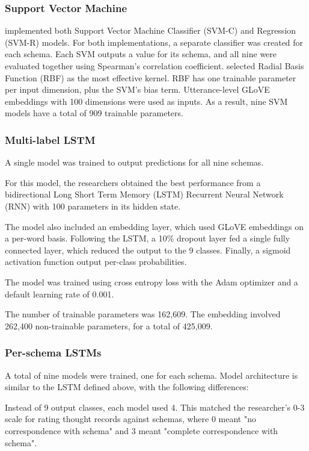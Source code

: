\documentclass[11pt,a4paper]{article}
\begin{document}
\subsubsection{Support Vector Machine}
\citeauthor{burger_2021} implemented both Support Vector Machine Classifier (SVM-C) and Regression (SVM-R) models. For both implementations, a separate classifier was created for each schema. Each SVM outputs a value for its schema, and all nine were evaluated together using Spearman's correlation coefficient. \citeauthor{burger_2021} selected Radial Basis Function (RBF) as the most effective kernel. RBF has one trainable parameter per input dimension, plus the SVM's bias term. Utterance-level GLoVE embeddings with 100 dimensions were used as inputs. As a result, nine SVM models have a total of 909 trainable parameters. 

\subsubsection{Multi-label LSTM}
\label{multi_lstm}
A single model was trained to output predictions for all nine schemas.

For this model, the researchers obtained the best performance from a bidirectional Long Short Term Memory (LSTM) Recurrent Neural Network (RNN) with 100 parameters in its hidden state.

The model also included an embedding layer, which used GLoVE embeddings on a per-word basis. Following the LSTM, a 10\% dropout layer fed a single fully connected layer, which reduced the output to the 9 classes. Finally, a sigmoid activation function output per-class probabilities. 

The model was trained using cross entropy loss with the Adam optimizer and a default learning rate of 0.001.

The number of trainable parameters was 162,609. The embedding involved 262,400 non-trainable parameters, for a total of 425,009.

\subsubsection{Per-schema LSTMs}
A total of nine models were trained, one for each schema. Model architecture is similar to the LSTM defined above, with the following differences:

Instead of 9 output classes, each model used 4. This matched the researcher's 0-3 scale for rating thought records against schemas, where 0 meant "no correspondence with schema" and 3 meant "complete correspondence with schema".
\end{document}

